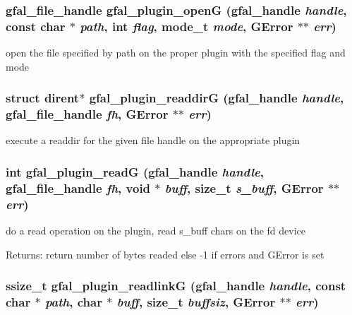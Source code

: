 \subsubsection{\setlength{\rightskip}{0pt plus 5cm}gfal\_\-file\_\-handle gfal\_\-plugin\_\-open\-G (gfal\_\-handle {\em handle}, const char $\ast$ {\em path}, int {\em flag}, mode\_\-t {\em mode}, GError $\ast$$\ast$ {\em err})}\label{gfal__common__plugin_8c_322dfbe0ad1e144573719ed08151281e}


open the file specified by path on the proper plugin with the specified flag and mode 
\subsubsection{\setlength{\rightskip}{0pt plus 5cm}struct dirent$\ast$ gfal\_\-plugin\_\-readdir\-G (gfal\_\-handle {\em handle}, gfal\_\-file\_\-handle {\em fh}, GError $\ast$$\ast$ {\em err})}\label{gfal__common__plugin_8c_7fd9e55c89de0f0a85127972cecffcfd}


execute a readdir for the given file handle on the appropriate plugin 
\subsubsection{\setlength{\rightskip}{0pt plus 5cm}int gfal\_\-plugin\_\-read\-G (gfal\_\-handle {\em handle}, gfal\_\-file\_\-handle {\em fh}, void $\ast$ {\em buff}, size\_\-t {\em s\_\-buff}, GError $\ast$$\ast$ {\em err})}\label{gfal__common__plugin_8c_d536879bc7813a35bc79318ce43f0b57}


do a read operation on the plugin, read s\_\-buff chars on the fd device \begin{Desc}
\item[Returns:]return number of bytes readed else -1 if errors and GError is set \end{Desc}
\subsubsection{\setlength{\rightskip}{0pt plus 5cm}ssize\_\-t gfal\_\-plugin\_\-readlink\-G (gfal\_\-handle {\em handle}, const char $\ast$ {\em path}, char $\ast$ {\em buff}, size\_\-t {\em buffsiz}, GError $\ast$$\ast$ {\em err})}\label{gfal__common__plugin_8c_d2e6e573b52926185793ff4f0dd5e307}


